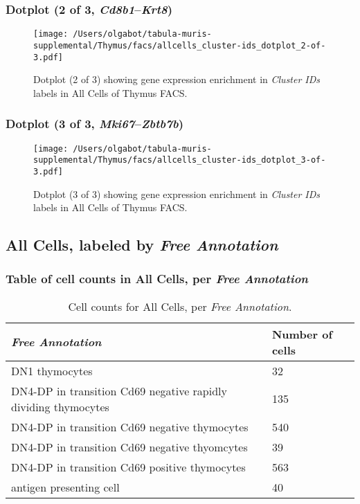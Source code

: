 \clearpage

\subsubsection{Dotplot (2 of 3, \emph{Cd8b1}--\emph{Krt8})}
\begin{figure}[h]
\centering
\texttt{[image: /Users/olgabot/tabula-muris-supplemental/Thymus/facs/allcells\_cluster-ids\_dotplot\_2-of-3.pdf]}

\caption{ Dotplot (2 of 3)  showing gene expression enrichment in \emph{Cluster IDs} labels in All Cells of Thymus FACS. }
\end{figure}


\clearpage

\subsubsection{Dotplot (3 of 3, \emph{Mki67}--\emph{Zbtb7b})}
\begin{figure}[h]
\centering
\texttt{[image: /Users/olgabot/tabula-muris-supplemental/Thymus/facs/allcells\_cluster-ids\_dotplot\_3-of-3.pdf]}

\caption{ Dotplot (3 of 3)  showing gene expression enrichment in \emph{Cluster IDs} labels in All Cells of Thymus FACS. }
\end{figure}


\clearpage

\subsection{All Cells, labeled by \emph{Free Annotation}}
\subsubsection{Table of cell counts in All Cells, per \emph{Free Annotation}}\begin{table}[h]
\centering
\label{my-label}
\begin{tabular}{@{}ll@{}}
\toprule

\emph{Free Annotation}& Number of cells \\ \midrule
DN1 thymocytes & 32 \\

DN4-DP in transition Cd69 negative rapidly dividing thymocytes & 135 \\

DN4-DP in transition Cd69 negative thymocytes & 540 \\

DN4-DP in transition Cd69 negative thyomcytes & 39 \\

DN4-DP in transition Cd69 positive thymocytes & 563 \\

antigen presenting cell & 40 \\
\bottomrule
\end{tabular}
\caption{Cell counts for All Cells, per \emph{Free Annotation}.}
\end{table}

